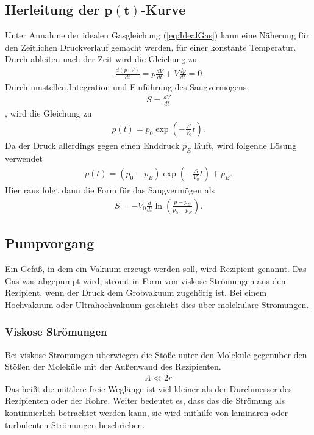 \subsection[Herleitung der $p(t)$-Kurve]{Herleitung der $\mathbf{p(t)}$-Kurve}
Unter Annahme der idealen Gasgleichung (\ref{eq:IdealGas})
kann eine Näherung für den Zeitlichen Druckverlauf gemacht werden, für einer konstante Temperatur.
Durch ableiten nach der Zeit wird die Gleichung zu
\begin{align}
\frac{d\left(p\cdot V \right)}{dt}=p\frac{dV}{dt}+V\frac{dp}{dt}=0
\end{align}
Durch umstellen,Integration und Einführung des Saugvermögens 
\begin{align}
S=\frac{dV}{dt}
\end{align} , wird die Gleichung zu
\begin{align}
p(t) = p_0 \exp\left(-\frac{S}{V_0}t\right).
\end{align}
Da der Druck allerdings gegen einen Enddruck $p_E$ läuft, wird folgende Lösung verwendet
\begin{align}
p(t) = \left( p_0-p_E \right) \exp\left(-\frac{S}{V_0}t\right) + p_E.
\end{align}
Hier raus folgt dann die Form für das Saugvermögen als
\begin{align}
S=-V_0\frac{d}{dt}\ln \left( \frac{p-p_E}{p_0-p_E} \right).
\end{align}
\subsection{Pumpvorgang}
Ein Gefäß, in dem ein Vakuum erzeugt werden soll, wird Rezipient genannt. Das Gas was abgepumpt wird, strömt in Form von viskose Strömungen aus dem Rezipient, wenn der Druck dem Grobvakuum zugehörig ist. Bei einem Hochvakuum oder Ultrahochvakuum geschieht dies über molekulare Strömungen.
\subsubsection{Viskose Strömungen}
Bei viskose Strömungen überwiegen die Stöße unter den Moleküle gegenüber den Stößen der Moleküle mit der Außenwand des Rezipienten.
\begin{align}
 \Lambda \ll 2 r
\end{align}
Das heißt die mittlere freie Weglänge ist viel kleiner als der Durchmesser des Rezipienten oder der Rohre. Weiter bedeutet es, dass das die Strömung als kontinuierlich betrachtet werden kann, sie wird mithilfe von laminaren oder turbulenten Strömungen beschrieben.

